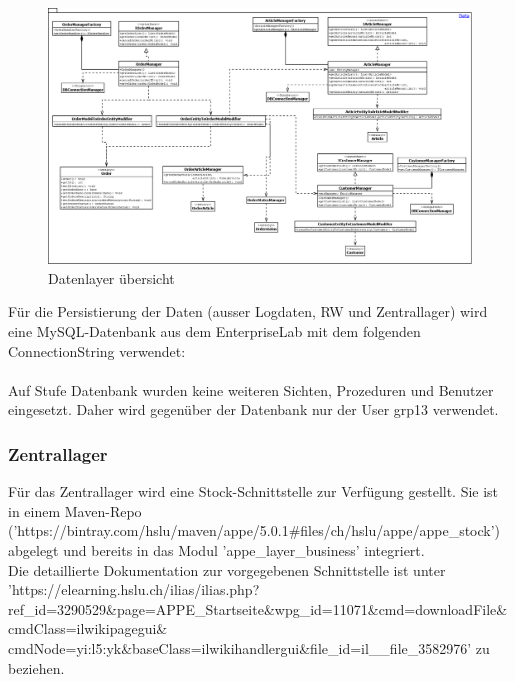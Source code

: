 \begin{figure}[H]
\centering
	\includegraphics[width=1.0\linewidth]{Images/Datalayer-classdia.png}
	\caption{Datenlayer übersicht}
	\label{fig:datalayer}
\end{figure}

Für die Persistierung der Daten (ausser Logdaten, RW und Zentrallager) wird eine MySQL-Datenbank aus dem EnterpriseLab mit dem folgenden ConnectionString verwendet:\\
\\
Auf Stufe Datenbank wurden keine weiteren Sichten, Prozeduren und Benutzer eingesetzt. Daher wird gegenüber der Datenbank nur der User grp13 verwendet.
\subsubsection{Zentrallager}
Für das Zentrallager wird eine Stock-Schnittstelle zur Verfügung gestellt. Sie ist in einem Maven-Repo ('https://bintray.com/hslu/maven/appe/5.0.1\#files/ch/hslu/appe/appe\_stock') abgelegt und bereits in das Modul 'appe\_layer\_business' integriert.\\
Die detaillierte Dokumentation zur vorgegebenen Schnittstelle ist unter\\
'https://elearning.hslu.ch/ilias/ilias.php?ref\_id=3290529\&page=APPE\_Startseite\&wpg\_id=11071\&cmd=downloadFile\&cmdClass=ilwikipagegui\& cmdNode=yi:l5:yk\&baseClass=ilwikihandlergui\&file\_id=il\_\_file\_3582976' zu beziehen.

